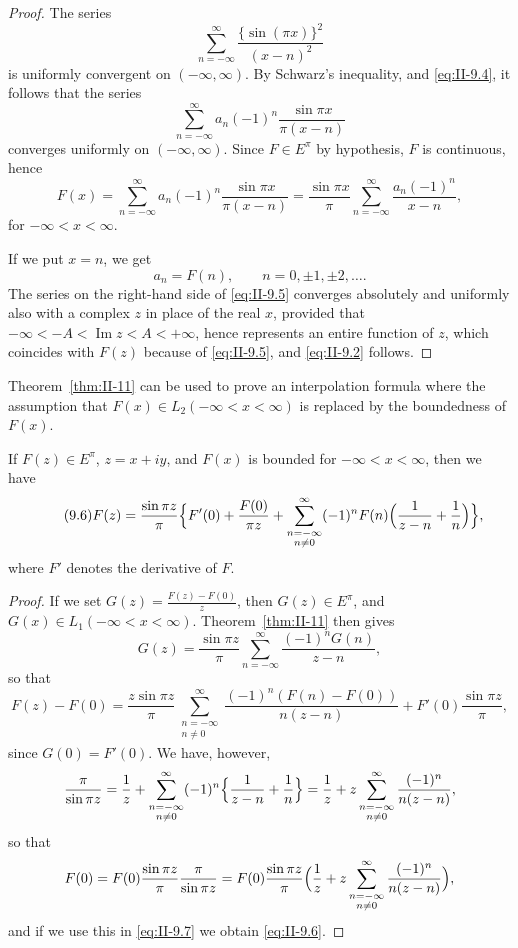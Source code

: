 \begin{proof}
The series
\[
\sum_{n=-\infty}^{\infty}\frac{\{\sin(\pi x)\}^{2}}{(x-n)^{2}}
\]
is uniformly convergent on $(-\infty,\infty)$. By Schwarz's inequality, and \eqref{eq:II-9.4}, it follows that the series
\[
\sum_{n=-\infty}^{\infty}a_{n}(-1)^{n}\frac{\sin\pi x}{\pi(x-n)}
\]
converges uniformly on $(-\infty,\infty)$. Since $F\in E^{\pi}$ by hypothesis, $F$ is continuous, hence
\begin{equation}\tag{9.5}\label{eq:II-9.5}
F(x)=\sum_{n=-\infty}^{\infty}a_{n}(-1)^{n}\frac{\sin\pi x}{\pi(x-n)}
=\frac{\sin\pi x}{\pi}\sum_{n=-\infty}^{\infty}\frac{a_{n}(-1)^{n}}{x-n},
\end{equation}
for $-\infty<x<\infty$.

If we put $x=n$, we get
\[
a_{n}=F(n),\qquad n=0,\pm1,\pm2,\dots.
\]
The series on the right-hand side of \eqref{eq:II-9.5} converges absolutely and uniformly also with a complex $z$ in place of the real $x$, provided that $-\infty<-A<\operatorname{Im}z<A<+\infty$, hence represents an entire function of $z$, which coincides with $F(z)$ because of \eqref{eq:II-9.5}, and \eqref{eq:II-9.2} follows.
\end{proof}

Theorem~\ref{thm:II-11} can be used to prove an interpolation formula where the assumption that $F(x)\in L_{2}(-\infty<x<\infty)$ is replaced by the boundedness of $F(x)$.

\begin{theorem}\label{thm:II-12}
If $F(z)\in E^{\pi}$, $z=x+iy$, and $F(x)$ is bounded for $-\infty<x<\infty$, then we have
\begin{equation}\tag{9.6}\label{eq:II-9.6}
F(z)=\frac{\sin\pi z}{\pi}\Bigl\{F'(0)+\frac{F(0)}{\pi z}
+\sum_{\substack{n=-\infty\\ n\neq 0}}^{\infty}(-1)^{n}F(n)\Bigl(\frac{1}{z-n}+\frac{1}{n}\Bigr)\Bigr\},
\end{equation}
where $F'$ denotes the derivative of $F$.
\end{theorem}
\begin{proof}
If we set $G(z)=\frac{F(z)-F(0)}{z}$, then $G(z)\in E^{\pi}$, and $G(x)\in L_{1}(-\infty<x<\infty)$. Theorem~\ref{thm:II-11} then gives
\[
G(z)=\frac{\sin\pi z}{\pi}\sum_{n=-\infty}^{\infty}\frac{(-1)^{n}G(n)}{z-n},
\]
so that
\begin{equation}\tag{9.7}\label{eq:II-9.7}
F(z)-F(0)=\frac{z\sin\pi z}{\pi}\sum_{\substack{n=-\infty\\ n\neq 0}}^{\infty}\frac{(-1)^{n}(F(n)-F(0))}{n(z-n)}+F'(0)\frac{\sin\pi z}{\pi},
\end{equation}
since $G(0)=F'(0)$. We have, however,
\[
\frac{\pi}{\sin\pi z}=\frac{1}{z}+\sum_{\substack{n=-\infty\\ n\neq 0}}^{\infty}(-1)^{n}\Bigl\{\frac{1}{z-n}+\frac{1}{n}\Bigr\}
=\frac{1}{z}+z\sum_{\substack{n=-\infty\\ n\neq 0}}^{\infty}\frac{(-1)^{n}}{n(z-n)},
\]
so that
\[
F(0)=F(0)\frac{\sin\pi z}{\pi}\frac{\pi}{\sin\pi z}
=F(0)\frac{\sin\pi z}{\pi}\Bigl(\frac{1}{z}+z\sum_{\substack{n=-\infty\\ n\neq 0}}^{\infty}\frac{(-1)^{n}}{n(z-n)}\Bigr),
\]
and if we use this in \eqref{eq:II-9.7} we obtain \eqref{eq:II-9.6}.
\end{proof}

